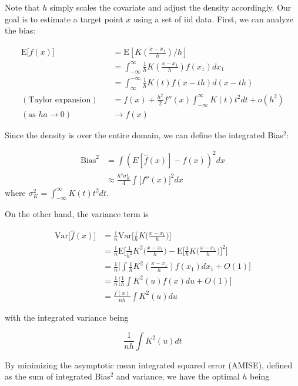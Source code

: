 \documentclass[
]{book}
\theoremstyle{definition}
\theoremstyle{definition}
\theoremstyle{definition}
\theoremstyle{definition}
\theoremstyle{remark}
\begin{document}
Note that \(h\) simply scales the covariate and adjust the density accordingly. Our goal is to estimate a target point \(x\) using a set of iid data. First, we can analyze the bias:

\begin{align}
    \text{E}\big[ \widehat f(x) \big] &= \text{E}\left[ K\left( \frac{x - x_1}{h} \right) \Big/ h \right] \\
    &= \int_{-\infty}^\infty \frac{1}{h} K\left(\frac{x-x_1}{h}\right) f(x_1) d x_1 \\
    &= \int_{\infty}^{-\infty} \frac{1}{h} K(t) f(x - th) d (x-th) \\
    (\text{Taylor expansion}) \quad &= f(x) + \frac{h^2}{2} f''(x) \int_{-\infty}^\infty K(t) t^2 dt + o(h^2) \\
    (\text{as } ha \rightarrow 0) \quad &\rightarrow f(x)
\end{align}

Since the density is over the entire domain, we can define the integrated Bias\(^2\):

\begin{align}
\text{Bias}^2 &= \int \left( E[\widehat f(x)] - f(x)\right)^2 dx \\
    &\approx \frac{h^4 \sigma_K^4}{4} \int \big[ f''(x)\big]^2 dx
\end{align}
where \(\sigma_K^2 = \int_{-\infty}^\infty K(t) t^2 dt\).

On the other hand, the variance term is

\begin{align}
  \text{Var}\big[ \widehat f(x) \big] &= \frac{1}{n} \text{Var}\Big[\frac{1}{h}K\big( \frac{x - x_1}{h} \big) \Big] \\
  &= \frac{1}{n} \text{E}\bigg[ \frac{1}{h^2} K^2\big( \frac{x - x_1}{h}\big) - \text{E}\Big[ \frac{1}{h} K\big( \frac{x - x_1}{h} \big)\Big]^2 \bigg]\\
  &= \frac{1}{n} \Big[ \int \frac{1}{h} K^2( \frac{x - x_1}{h} ) f(x_1) dx_1 + O(1) \Big] \\
  &= \frac{1}{n} \Big[ \frac{1}{h} \int K^2( u ) f(x) du + O(1) \Big] \\
  &= \frac{f(x)}{nh} \int K^2( u ) du 
\end{align}

with the integrated variance being

\[\frac{1}{nh} \int K^2( u ) dt \]

By minimizing the asymptotic mean integrated squared error (AMISE), defined as the sum of integrated Bias\(^2\) and variance, we have the optimal \(h\) being
\end{document}

